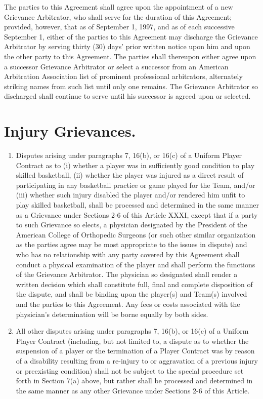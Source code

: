 \documentclass[
]{book}
\providecommand{\tightlist}{%
  \setlength{\itemsep}{0pt}\setlength{\parskip}{0pt}}
\begin{document}
The parties to this Agreement shall agree upon the appointment of a new Grievance Arbitrator, who shall serve for the duration of this Agreement; provided, however, that as of September 1, 1997, and as of each successive September 1, either of the parties to this Agreement may discharge the Grievance Arbitrator by serving thirty (30) days' prior written notice upon him and upon the other party to this Agreement. The parties shall thereupon either agree upon a successor Grievance Arbitrator or select a successor from an American Arbitration Association list of prominent professional arbitrators, alternately striking names from such list until only one remains. The Grievance Arbitrator so discharged shall continue to serve until his successor is agreed upon or selected.

\hypertarget{injury-grievances.}{%
\section{Injury Grievances.}\label{injury-grievances.}}

\begin{enumerate}
\def\labelenumi{(\alph{enumi})}
\tightlist
\item
  Disputes arising under paragraphs 7, 16(b), or 16(c) of a Uniform Player Contract as to (i) whether a player was in sufficiently good condition to play skilled basketball, (ii) whether the player was injured as a direct result of participating in any basketball practice or game played for the Team, and/or (iii) whether such injury disabled the player and/or rendered him unfit to play skilled basketball, shall be processed and determined in the same manner as a Grievance under Sections 2-6 of this Article XXXI, except that if a party to such Grievance so elects, a physician designated by the President of the American College of Orthopedic Surgeons (or such other similar organization as the parties agree may be most appropriate to the issues in dispute) and who has no relationship with any party covered by this Agreement shall conduct a physical examination of the player and shall perform the functions of the Grievance Arbitrator. The physician so designated shall render a written decision which shall constitute full, final and complete disposition of the dispute, and shall be binding upon the player(s) and Team(s) involved and the parties to this Agreement. Any fees or costs associated with the physician's determination will be borne equally by both sides.
\item
  All other disputes arising under paragraphs 7, 16(b), or 16(c) of a Uniform Player Contract (including, but not limited to, a dispute as to whether the suspension of a player or the termination of a Player Contract was by reason of a disability resulting from a re-injury to or aggravation of a previous injury or preexisting condition) shall not be subject to the special procedure set forth in Section 7(a) above, but rather shall be processed and determined in the same manner as any other Grievance under Sections 2-6 of this Article.
\end{enumerate}
\end{document}
